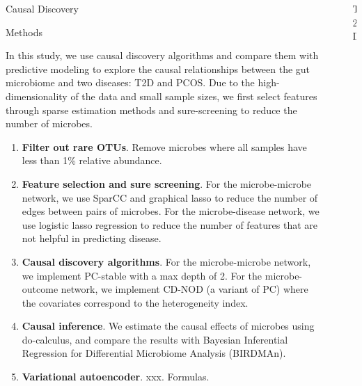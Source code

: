 \documentclass[final]{beamer}
\newlength{\sepwidth}
\newlength{\colwidth}
\newcommand{\separatorcolumn}{\begin{column}{\sepwidth}\end{column}}
\begin{document}
\begin{frame}[t]
\begin{columns}[t]
\begin{column}{\colwidth}
\begin{alertblock}{Causal Discovery}
	  \end{alertblock}
	  
\begin{block}{Methods}

   In this study, we use causal discovery algorithms and compare them with 
   predictive modeling to explore the causal relationships between the 
   gut microbiome and two diseases: T2D and PCOS. Due to the high-dimensionality
   of the data and small sample sizes, we first select features through sparse
   estimation methods and sure-screening to reduce the number of microbes. 

    \begin{enumerate}
      \item \textbf{Filter out rare OTUs}. Remove microbes where all samples have less than 1\%
      relative abundance. 
      \item \textbf{Feature selection and sure screening}. For the microbe-microbe network, we use SparCC and graphical lasso to reduce the number of edges between pairs of microbes.
      For the microbe-disease network, we use logistic lasso regression to reduce the number of features that are not helpful in predicting disease. 
      \item \textbf{Causal discovery algorithms}. For the microbe-microbe network, we implement PC-stable with a max depth of 2. For the microbe-outcome network, we implement CD-NOD (a variant of PC) where the covariates correspond to the heterogeneity index. 
      \item \textbf{Causal inference}. We estimate the causal effects of microbes using do-calculus, and compare the results with Bayesian Inferential Regression for Differential Microbiome Analysis (BIRDMAn).
      \item \textbf{Variational autoencoder}. xxx. Formulas.
    \end{enumerate}

  \end{block}


\end{column}

\separatorcolumn

\begin{column}{\colwidth}

  
  \begin{block}{T2D}



\end{block}
\end{column}
\end{columns}
\end{frame}
\end{document}
